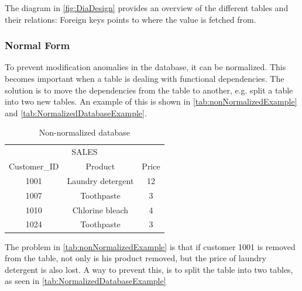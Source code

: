The diagram in \autoref{fig:DiaDesign} provides an overview of the different tables and their relations: Foreign keys points to where the value is fetched from.

\subsubsection{Normal Form}
To prevent modification anomalies in the database, it can be normalized. This becomes important when a table is dealing with functional dependencies. The solution is to move the dependencies from the table to another, e.g. split a table into two new tables. An example of this is shown in \autoref{tab:nonNormalizedExample} and \autoref{tab:NormalizedDatabaseExample}.

\begin{table}[htbp]
	\centering
		\begin{tabular}{|c|c|c|}
		\hline
		 \multicolumn{3}{|c|}{SALES}\\
		\multicolumn{1}{|c}{Customer\_ID} & \multicolumn{1}{c}{Product} & \multicolumn{1}{c|}{Price} \\
		\hline
		1001 & Laundry detergent & 12 \\ \hline
		1007 & Toothpaste & 3 \\ \hline
		1010 & Chlorine bleach & 4 \\ \hline
		1024 & Toothpaste & 3\\	\hline
		\end{tabular}
	\caption{Non-normalized database\cite[p. 114]{sqlForDummies}}
	\label{tab:nonNormalizedExample}
\end{table}

The problem in \autoref{tab:nonNormalizedExample} is that if customer 1001 is removed from the table, not only is his product removed, but the price of laundry detergent is also lost. A way to prevent this, is to split the table into two tables, as seen in \autoref{tab:NormalizedDatabaseExample}

